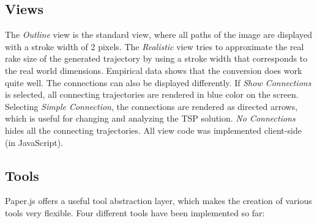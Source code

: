 \subsection{Views} The \textit{Outline} view is the standard view, where all paths of the image are displayed with a stroke width of 2 pixels. The \textit{Realistic} view tries to approximate the real rake size of the generated trajectory by using a stroke width that corresponds to the real world dimensions. Empirical data shows that the conversion does work quite well. The connections can also be displayed differently. If \textit{Show Connections} is selected, all connecting trajectories are rendered in blue color on the screen. Selecting \textit{Simple Connection}, the connections are rendered as directed arrows, which is useful for changing and analyzing the TSP solution. \textit{No Connections} hides all the connecting trajectories. All view code was implemented client-side (in JavaScript).

\subsection{Tools}

Paper.js offers a useful tool abstraction layer, which makes the creation of various tools very flexible. Four different tools have been implemented so far:

